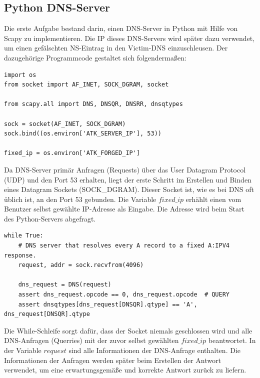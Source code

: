 \documentclass[10pt,a4paper]{article}
\begin{document}
\subsection{Python DNS-Server}
Die erste Aufgabe bestand darin, einen DNS-Server in Python mit Hilfe von Scapy zu implementieren. Die IP dieses DNS-Servers wird später dazu verwendet, um einen gefälschten NS-Eintrag in den Victim-DNS einzuschleusen. Der dazugehörige Programmcode gestaltet sich folgendermaßen:
\begin{center}
\begin{lstlisting}
import os
from socket import AF_INET, SOCK_DGRAM, socket

from scapy.all import DNS, DNSQR, DNSRR, dnsqtypes

sock = socket(AF_INET, SOCK_DGRAM)
sock.bind((os.environ['ATK_SERVER_IP'], 53))

fixed_ip = os.environ['ATK_FORGED_IP']
\end{lstlisting}
\end{center}
Da DNS-Server primär Anfragen (Requests) über das User Datagram Protocol (UDP) und den Port 53 erhalten, liegt der erste Schritt im Erstellen und Binden eines Datagram Sockets (SOCK\_DGRAM). Dieser Socket ist, wie es bei DNS oft üblich ist, an den Port 53 gebunden. Die Variable $fixed\_ip$ erhählt einen vom Benutzer selbst gewählte IP-Adresse als Eingabe. Die Adresse wird beim Start des Python-Servers abgefragt.
\begin{center}
\begin{lstlisting}
while True:
    # DNS server that resolves every A record to a fixed A:IPV4 response.
    request, addr = sock.recvfrom(4096)

    dns_request = DNS(request)
    assert dns_request.opcode == 0, dns_request.opcode  # QUERY
    assert dnsqtypes[dns_request[DNSQR].qtype] == 'A', dns_request[DNSQR].qtype
\end{lstlisting}
\end{center}
Die While-Schleife sorgt dafür, dass der Socket niemals geschlossen wird und alle DNS-Anfragen (Querries) mit der zuvor selbst gewählten $\mathit{fixed\_ip}$ beantwortet. In der Variable $\mathit{request}$ sind alle Informationen der DNS-Anfrage enthalten. Die Informationen der Anfragen werden später beim Erstellen der Antwort verwendet, um eine erwartungsgemäße und korrekte Antwort zurück zu liefern. 
\end{document}
